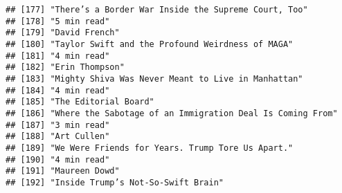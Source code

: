 \documentclass[
]{article}
\begin{document}
\begin{verbatim}
## [177] "There’s a Border War Inside the Supreme Court, Too"                                                                                                       
## [178] "5 min read"                                                                                                                                               
## [179] "David French"                                                                                                                                             
## [180] "Taylor Swift and the Profound Weirdness of MAGA"                                                                                                          
## [181] "4 min read"                                                                                                                                               
## [182] "Erin Thompson"                                                                                                                                            
## [183] "Mighty Shiva Was Never Meant to Live in Manhattan"                                                                                                        
## [184] "4 min read"                                                                                                                                               
## [185] "The Editorial Board"                                                                                                                                      
## [186] "Where the Sabotage of an Immigration Deal Is Coming From"                                                                                                 
## [187] "3 min read"                                                                                                                                               
## [188] "Art Cullen"                                                                                                                                               
## [189] "We Were Friends for Years. Trump Tore Us Apart."                                                                                                          
## [190] "4 min read"                                                                                                                                               
## [191] "Maureen Dowd"                                                                                                                                             
## [192] "Inside Trump’s Not-So-Swift Brain"                                                                                                                        

\end{verbatim}
\end{document}
